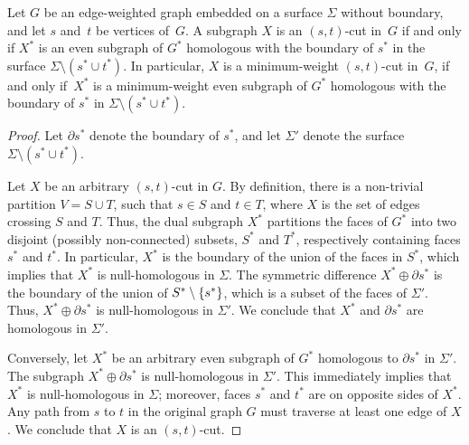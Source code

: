 \documentclass[letterpaper,review]{siamart190516}
\def\Cut{X}
\begin{document}
\begin{lemma}
\label{lem:cut-duality}
Let $G$ be an edge-weighted graph embedded on a surface $\Sigma$ without boundary, and let $s$ and~$t$ be vertices of~$G$.  A subgraph $\Cut$ is an $(s,t)$-cut in~$G$ if and only if $\Cut^*$ is an even subgraph of $G^*$ homologous with the boundary of $s^*$ in the surface $\Sigma\setminus(s^*\cup t^*)$.
In particular, $X$ is a minimum-weight $(s,t)$-cut in~$G$, if and only if~$\Cut^*$ is a minimum-weight even subgraph of $G^*$ homologous with the boundary of $s^*$ in $\Sigma\setminus(s^*\cup t^*)$.
\end{lemma}

\begin{proof}
Let $\partial s^*$ denote the boundary of $s^*$, and let $\Sigma'$ denote the surface $\Sigma\setminus {(s^*\cup t^*)}$.

Let $\Cut$ be an arbitrary $(s,t)$-cut in $G$.  By definition, there is a non-trivial partition $V = S\cup T$, such that $s\in S$ and $t\in T$, where $\Cut$ is the set of edges crossing $S$ and $T$.
Thus, the dual subgraph $\Cut^*$ partitions the faces of $G^*$ into two disjoint (possibly non-connected) subsets, $S^*$ and $T^*$, respectively containing faces $s^*$ and $t^*$.  In particular, $\Cut^*$ is the boundary of the union of the faces in $S^*$, which implies that $\Cut^*$ is null-homologous in $\Sigma$.  The symmetric difference $\Cut^* \oplus \partial s^*$ is the boundary of the union of $S^* \setminus\{ s^* \}$, which is a subset of the faces of $\Sigma'$.  Thus, $\Cut^*\oplus \partial s^*$ is null-homologous in $\Sigma'$.  We conclude that $\Cut^*$ and  $\partial s^*$ are homologous in $\Sigma'$.

Conversely, let $\Cut^*$ be an arbitrary even subgraph of $G^*$ homologous to $\partial s^*$ in $\Sigma'$.  The subgraph $\Cut^*\oplus \partial s^*$ is null-homologous in $\Sigma'$.  This immediately implies that $X^*$ is null-homologous in $\Sigma$; moreover, faces $s^*$ and $t^*$ are on opposite sides of $X^*$.  Any path from $s$ to $t$ in the original graph $G$ must traverse at least one edge of $\Cut$.  We conclude that $\Cut$ is an $(s,t)$-cut.
\end{proof}
\end{document}
